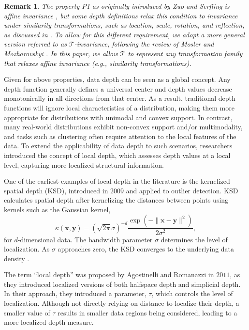 \documentclass[final,3p,times]{elsarticle}
\newtheorem{remark}{\bf Remark}[section]
\begin{document}
\begin{remark}
The property P1 as originally introduced by Zuo and Serfling is affine invariance \cite{zuo2000general}, but some depth definitions relax this condition to invariance under similarity transformations, such as location, scale, rotation, and reflection, as discussed in \cite{serfling2002depth, cuevas2009depth, ramsay2019integrated}. To allow for this different requirement, we adopt a more general version referred to as $\mathcal{T}$-invariance, following the review of Mosler and Mozharovskyi \cite{mosler2022choosing}. \textcolor{black}{In this paper, we allow $\mathcal{T}$ to represent any transformation family that relaxes affine invariance (e.g., similarity transformations).}
\end{remark}

Given for above properties, data depth can be seen as a global concept. Any depth function generally defines a universal center and depth values decrease monotonically in all directions from that center. As a result, traditional depth functions will ignore local characteristics of a distribution, making them more appropriate for distributions with unimodal and convex support. In contrast, many real-world distributions exhibit non-convex support and/or multimodality, and tasks such as clustering often require attention to the local features of the data. To extend the applicability of data depth to such scenarios, researchers introduced the concept of local depth, which assesses depth values at a local level, capturing more localized structural information.

One of the earliest examples of local depth in the literature is the kernelized spatial depth (KSD), introduced in $2009$ \cite{chen2008outlier} and applied to outlier detection. KSD calculates spatial depth after kernelizing the distances between points using kernels such as the Gaussian kernel, $$\kappa(\mathbf{x},\mathbf{y})=(\sqrt{2\pi}\sigma)^{-d}\frac{\exp(-\|\mathbf{x}-\mathbf{y}\|^{2})}{2\sigma^{2}},$$ for $d$-dimensional data. The bandwidth parameter $\sigma$ determines the level of localization. As $\sigma$ approaches zero, the KSD converges to the underlying data density \cite{dutta2016multi}.

The term ``local depth'' was proposed by Agostinelli and Romanazzi \cite{agostinelli2011local} in $2011$, as they introduced localized versions of both halfspace depth and simplicial depth. In their approach, they introduced a parameter, $\tau$, which controls the level of localization. Although not directly relying on distance to localize their depth, a smaller value of $\tau$ results in smaller data regions being considered, leading to a more localized depth measure.
\end{document}
